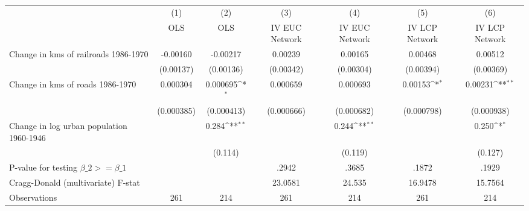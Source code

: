 {
\def\sym#1{\ifmmode^{#1}\else\(^{#1}\)\fi}
\begin{tabular}{l*{6}{c}}
\hline\hline
                &\multicolumn{1}{c}{(1)}&\multicolumn{1}{c}{(2)}&\multicolumn{1}{c}{(3)}&\multicolumn{1}{c}{(4)}&\multicolumn{1}{c}{(5)}&\multicolumn{1}{c}{(6)}\\
                &\multicolumn{1}{c}{OLS}&\multicolumn{1}{c}{OLS}&\multicolumn{1}{c}{IV EUC Network}&\multicolumn{1}{c}{IV EUC Network}&\multicolumn{1}{c}{IV LCP Network}&\multicolumn{1}{c}{IV LCP Network}\\
\hline
Change in kms of railroads 1986-1970& -0.00160         & -0.00217         &  0.00239         &  0.00165         &  0.00468         &  0.00512         \\
                &(0.00137)         &(0.00136)         &(0.00342)         &(0.00304)         &(0.00394)         &(0.00369)         \\
[1em]
Change in kms of roads 1986-1970& 0.000304         & 0.000695\sym{*}  & 0.000659         & 0.000693         &  0.00153\sym{*}  &  0.00231\sym{**} \\
                &(0.000385)         &(0.000413)         &(0.000666)         &(0.000682)         &(0.000798)         &(0.000938)         \\
[1em]
Change in log urban population 1960-1946&                  &    0.284\sym{**} &                  &    0.244\sym{**} &                  &    0.250\sym{*}  \\
                &                  &  (0.114)         &                  &  (0.119)         &                  &  (0.127)         \\
\hline
P-value for testing $\beta\_{2} >= \beta\_{1}$&                  &                  &    .2942         &    .3685         &    .1872         &    .1929         \\
Cragg-Donald (multivariate) F-stat&                  &                  &  23.0581         &   24.535         &  16.9478         &  15.7564         \\
Observations    &      261         &      214         &      261         &      214         &      261         &      214         \\
\hline\hline
\end{tabular}
}
